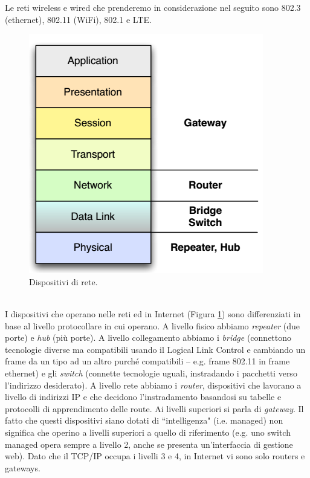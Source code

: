 Le reti wireless e wired che prenderemo in considerazione nel seguito sono 802.3 (ethernet), 802.11 (WiFi), 802.1 e LTE.
\begin{figure}[htbp]
	\centering
	\includegraphics[scale = 0.55]{images/network-devices}
	\caption{Dispositivi di rete.}
	\label{img:network-devices}
\end{figure}\\
I dispositivi che operano nelle reti ed in Internet (Figura \ref{img:network-devices}) sono differenziati in base al livello protocollare in cui operano. A livello fisico abbiamo \textit{repeater} (due porte) e \textit{hub} (più porte). A livello collegamento abbiamo i \textit{bridge} (connettono tecnologie diverse ma compatibili usando il Logical Link Control e cambiando un frame da un tipo ad un altro purché compatibili -- e.g. frame 802.11 in frame ethernet) e gli \textit{switch} (connette tecnologie uguali, instradando i pacchetti verso l'indirizzo desiderato). A livello rete abbiamo i \textit{router}, dispositivi che lavorano a livello di indirizzi IP e che decidono l'instradamento basandosi su tabelle e protocolli di apprendimento delle route. Ai livelli superiori si parla di \textit{gateway}. Il fatto che questi dispositivi siano dotati di \textquotedblleft intelligenza" (i.e. managed) non significa che operino a livelli superiori a quello di riferimento (e.g. uno switch managed opera sempre a livello 2, anche se presenta un'interfaccia di gestione web). Dato che il TCP/IP occupa i livelli 3 e 4, in Internet vi sono solo routers e gateways.

